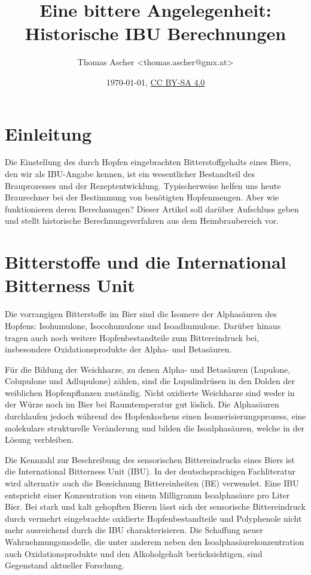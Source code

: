 \documentclass[a4paper,parskip=half]{scrartcl}
\title{Eine bittere Angelegenheit: Historische IBU Berechnungen}
\author{Thomas Ascher <thomas.ascher@gmx.at>}
\date{\today, \href{http://creativecommons.org/licenses/by-sa/4.0/}{CC BY-SA 4.0}}
\begin{document}
\maketitle

\section*{Einleitung}

Die Einstellung des durch Hopfen eingebrachten Bitterstoffgehalts eines Biers, den wir als IBU-Angabe kennen, ist ein wesentlicher Bestandteil des Brauprozesses und der Rezeptentwicklung. Typischerweise helfen uns heute Braurechner bei der Bestimmung von benötigten Hopfenmengen. Aber wie funktionieren deren Berechnungen? Dieser Artikel soll darüber Aufschluss geben und stellt historische Berechnungsverfahren aus dem Heimbraubereich vor.

\section*{Bitterstoffe und die International Bitterness Unit}

Die vorrangigen Bitterstoffe im Bier sind die Isomere der Alphasäuren des Hopfens: Isohumulone, Isocohumulone und Isoadhumulone. Darüber hinaus tragen auch noch weitere Hopfenbestandteile zum Bittereindruck bei, insbesondere Oxidationsprodukte der Alpha- und Betasäuren. \parencite{MEBAK2020}

Für die Bildung der Weichharze, zu denen Alpha- und Betasäuren (Lupulone, Colupulone und Adlupulone) zählen, sind die Lupulindrüsen in den Dolden der weiblichen Hopfenpflanzen zuständig. Nicht oxidierte Weichharze sind weder in der Würze noch im Bier bei Raumtemperatur gut löslich. Die Alphasäuren durchlaufen jedoch während des Hopfenkochens einen Isomerisierungsprozess, eine molekulare strukturelle Veränderung und bilden die Isoalphasäuren, welche in der Lösung verbleiben. \parencites{Hall1997}[20-23]{Nottebohm2020}

Die Kennzahl zur Beschreibung des sensorischen Bittereindrucks eines Biers ist die International Bitterness Unit (IBU). In der deutschsprachigen Fachliteratur wird alternativ auch die Bezeichnung Bittereinheiten (BE) verwendet. Eine IBU entspricht einer Konzentration von einem Milligramm Isoalphasäure pro Liter Bier. Bei stark und kalt gehopften Bieren lässt sich der sensorische Bittereindruck durch vermehrt eingebrachte oxidierte Hopfenbestandteile und Polyphenole nicht mehr ausreichend durch die IBU charakterisieren. Die Schaffung neuer Wahrnehmungsmodelle, die unter anderem neben den Isoalphasäurekonzentration auch Oxidationsprodukte und den Alkoholgehalt berücksichtigen, sind Gegenstand aktueller Forschung. \parencite{Kishimoto2021}
\end{document}
